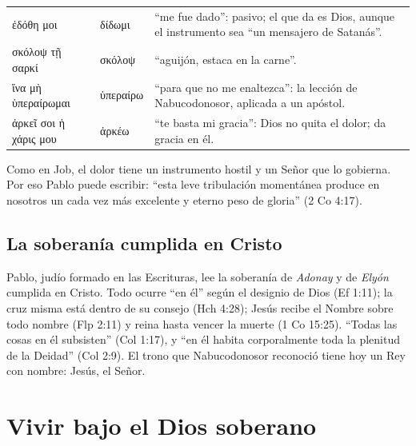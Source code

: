 \documentclass[11pt,letterpaper]{article}
\newcommand{\grc}[1]{\foreignlanguage{ancientgreek}{#1}}
\begin{document}
\begin{filologia}[2 Co 12:7--9]
\begin{tabular}{@{}L{4.2cm}L{1.6cm}L{9cm}@{}}
\grc{ἐδόθη μοι} & \grc{δίδωμι} & ``me fue dado'': pasivo; el que da es Dios, aunque el instrumento sea ``un mensajero de Satanás''. \\[2pt]
\grc{σκόλοψ τῇ σαρκί} & \grc{σκόλοψ} & ``aguijón, estaca en la carne''. \\[2pt]
\grc{ἵνα μὴ ὑπεραίρωμαι} & \grc{ὑπεραίρω} & ``para que no me enaltezca'': la lección de Nabucodonosor, aplicada a un apóstol. \\[2pt]
\grc{ἀρκεῖ σοι ἡ χάρις μου} & \grc{ἀρκέω} & ``te basta mi gracia'': Dios no quita el dolor; da gracia en él. \\
\end{tabular}
\end{filologia}

Como en Job, el dolor tiene un instrumento hostil y un Señor que lo gobierna. Por eso Pablo puede escribir: ``esta leve tribulación momentánea produce en nosotros un cada vez más excelente y eterno peso de gloria'' (2 Co 4:17).

\subsection{La soberanía cumplida en Cristo}
Pablo, judío formado en las Escrituras, lee la soberanía de \emph{Adonay} y de \emph{Elyón} cumplida en Cristo. Todo ocurre ``en él'' según el designio de Dios (Ef 1:11); la cruz misma está dentro de su consejo (Hch 4:28); Jesús recibe el Nombre sobre todo nombre (Flp 2:11) y reina hasta vencer la muerte (1 Co 15:25). ``Todas las cosas en él subsisten'' (Col 1:17), y ``en él habita corporalmente toda la plenitud de la Deidad'' (Col 2:9). El trono que Nabucodonosor reconoció tiene hoy un Rey con nombre: Jesús, el Señor.

\section{Vivir bajo el Dios soberano}
\end{document}
